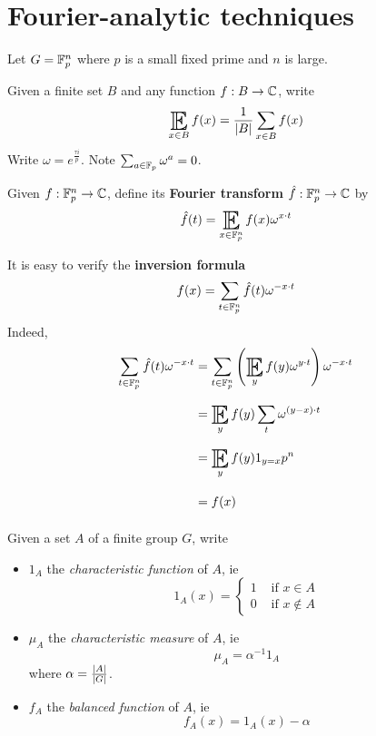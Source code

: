 \documentclass{article}
\begin{document}
\maketitle

\tableofcontents

\clearpage
\section{Fourier-analytic techniques}

\newlec

Let $G = \mathbb F_p^n$ where $p$ is a small fixed prime and $n$ is large.

\begin{notation}
  Given a finite set $B$ and any function $f : B \to \mathbb C$, write
  $$\E_{x \in B} f(x) = \frac 1{\abs B} \sum_{x \in B} f(x)$$
  Write $\omega = e^{\frac{\tau i}p}$. Note $\sum_{a \in \mathbb F_p} \omega^a = 0$.
\end{notation}

\begin{ndef}
  Given $f : \mathbb F_p^n \to \mathbb C$, define its {\bf Fourier transform} $\hat f : \mathbb F_p^n \to \mathbb C$ by
  $$\hat f(t) = \E_{x \in \F_p^n} f(x) \omega^{x \cdot t}$$
\end{ndef}

It is easy to verify the {\bf inversion formula}
$$f(x) = \sum_{t \in \mathbb F_p^n} \hat f(t)\omega^{-x \cdot t}$$
Indeed,
\begin{align*}
  \sum_{t \in \F_p^n} \hat f(t) \omega^{-x \cdot t}
  & = \sum_{t \in \F_p^n} \left(\E_y f(y)\omega^{y \cdot t}\right) \omega^{-x \cdot t} \\
  & = \E_y f(y) \sum_t \omega^{(y - x) \cdot t} \\
  & = \E_y f(y) 1_{y = x} p^n \\
  & = f(x)
\end{align*}

\begin{notation}
  Given a set $A$ of a finite group $G$, write
  \begin{itemize}
    \item $1_A$ the {\it characteristic function} of $A$, ie
    $$1_A(x) = \begin{cases}
      1 & \text{ if } x \in A \\
      0 & \text{ if } x \nin A
    \end{cases}$$
    \item $\mu_A$ the {\it characteristic measure} of $A$, ie
    $$\mu_A = \alpha^{-1} 1_A$$
    where $\alpha = \frac{\left\lvert A\right\rvert}{\left\lvert G\right\rvert}$.
    \item $f_A$ the {\it balanced function} of $A$, ie
    $$f_A(x) = 1_A(x) - \alpha$$
  \end{itemize}
\end{notation}
\end{document}
